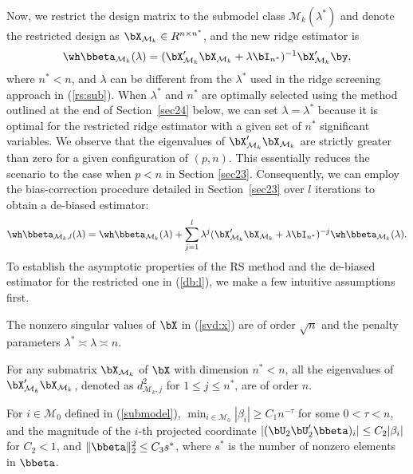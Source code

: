 Now, we restrict the design matrix to the submodel class $\mathcal{M}_k(\lambda^*)$ and denote the restricted design as $\bX_{\mathcal{M}_k}\in R^{n \times n^*}$, and the new ridge estimator is 
\begin{equation}\label{r:rd}
    \wh\bbeta_{\mathcal{M}_k}(\lambda)=(\bX_{\mathcal{M}_k}'\bX_{\mathcal{M}_k}+\lambda\bI_{n^*})^{-1}\bX_{\mathcal{M}_k}'\by,
\end{equation}
where $n^*< n$, and $\lambda$ can be different from the $\lambda^*$ used in the ridge screening approach in (\ref{rs:sub}). When 
$\lambda^*$
  and 
$n^*$
  are optimally selected using the method outlined at the end of Section~\ref{sec24} below, we can set 
$\lambda=\lambda^*$
  because it is optimal for the restricted ridge estimator with a given set of $n^*$ significant variables. We observe that the eigenvalues of $\bX_{\mathcal{M}_k}'\bX_{\mathcal{M}_k}$ are strictly greater than zero for a given configuration of $(p,n)$. This essentially reduces the scenario to the case when $p<n$ in Section \ref{sec23}. Consequently, we can employ the bias-correction procedure detailed in Section~\ref{sec23} over $l$ iterations to obtain a de-biased estimator:
\begin{equation}\label{db:l}
    \wh\bbeta_{\mathcal{M}_k,l}(\lambda)=\wh\bbeta_{\mathcal{M}_k}(\lambda)+\sum_{j=1}^l\lambda^j(\bX_{\mathcal{M}_k}'\bX_{\mathcal{M}_k}+\lambda\bI_{n^*})^{-j}\wh\bbeta_{\mathcal{M}_k}(\lambda).
\end{equation}
To establish the asymptotic properties of the RS method and the de-biased estimator for the restricted one in (\ref{db:l}), we make a few intuitive assumptions first.
\begin{assumption}\label{asm3}
    The nonzero singular values of $\bX$ in (\ref{svd:x}) are of order $\sqrt{n}$ and the penalty parameters $\lambda^*\asymp\lambda\asymp n$.
\end{assumption}
\begin{assumption}\label{asm30}
    For any submatrix $\bX_{\mathcal{M}_k}$ of $\bX$ with dimension $n^*< n$, all the eigenvalues of $\bX_{\mathcal{M}_k}'\bX_{\mathcal{M}_k}$, denoted as $d_{\mathcal{M}_k,j}^2$ for $1\leq j\leq n^*$, are of order $n$.
\end{assumption}
\begin{assumption}\label{asm4}
    For $i\in \mathcal{M}_0$ defined in (\ref{submodel}), $\min_{i\in\mathcal{M}_0}|\beta_i|\geq C_1n^{-\tau}$ for some $0< \tau< n$, and the magnitude of the $i$-th projected coordinate $|(\bU_2\bU_2'\bbeta)_i|\leq C_2|\beta_i|$ for $C_2<1$,  and $\|\bbeta\|_2^2\leq C_3s^*$, where $s^*$ is the number of nonzero elements in $\bbeta$.
\end{assumption}
